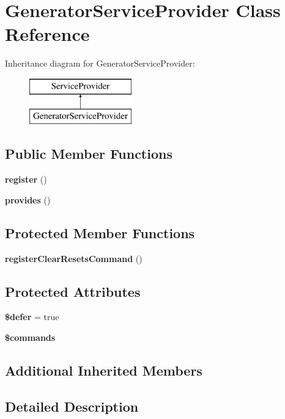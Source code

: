 \section{Generator\+Service\+Provider Class Reference}
\label{class_illuminate_1_1_auth_1_1_generator_service_provider}
Inheritance diagram for Generator\+Service\+Provider\+:\begin{figure}[H]
\begin{center}
\leavevmode
\includegraphics[height=2.000000cm]{class_illuminate_1_1_auth_1_1_generator_service_provider}
\end{center}
\end{figure}
\subsection*{Public Member Functions}
\begin{DoxyCompactItemize}
\item 
{\bf register} ()
\item 
{\bf provides} ()
\end{DoxyCompactItemize}
\subsection*{Protected Member Functions}
\begin{DoxyCompactItemize}
\item 
{\bf register\+Clear\+Resets\+Command} ()
\end{DoxyCompactItemize}
\subsection*{Protected Attributes}
\begin{DoxyCompactItemize}
\item 
{\bf \$defer} = true
\item 
{\bf \$commands}
\end{DoxyCompactItemize}
\subsection*{Additional Inherited Members}


\subsection{Detailed Description}


